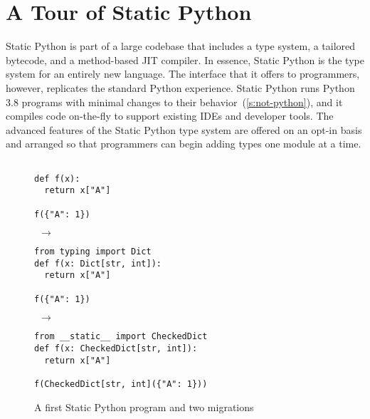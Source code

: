 \documentclass[english,cleveref,submission]{programming}
\newcommand{\SP}{Static Python}
\begin{document}
\section{A Tour of \SP{}}
\label{s:tour}


\SP{} is part of a large codebase that includes a type system, a tailored
bytecode, and a method-based JIT compiler.
In essence, \SP{} is the type system for an entirely new language.
The interface that it offers to programmers, however, replicates the
standard Python experience.
\SP{} runs Python 3.8 programs with minimal changes to their
behavior~(\cref{s:not-python}),
and it compiles code on-the-fly to support existing
IDEs and developer tools.
The advanced features of the \SP{} type system are offered on an opt-in basis
and arranged so that programmers can begin adding types one module at a time.

\begin{figure}
  \begin{minipage}{0.15\columnwidth}\noindent\begin{lstlisting}

def f(x):
  return x["A"]

f({"A": 1})
  \end{lstlisting}
\end{minipage}\begin{minipage}{0.07\columnwidth}\(~~\rightarrow\!\!\!\!\)\end{minipage}\begin{minipage}{0.32\columnwidth}\noindent\begin{lstlisting}
from typing import Dict
def f(x: Dict[str, int]):
  return x["A"]

f({"A": 1})
  \end{lstlisting}
  \end{minipage}\begin{minipage}{0.07\columnwidth}\(~~\rightarrow\!\!\!\!\)\end{minipage}\begin{minipage}{0.38\columnwidth}\noindent\begin{lstlisting}
from __static__ import CheckedDict
def f(x: CheckedDict[str, int]):
  return x["A"]

f(CheckedDict[str, int]({"A": 1}))
  \end{lstlisting}
  \end{minipage}


  \caption{A first \SP{} program and two migrations}
  \label{fig:sp-example}
\end{figure}
\end{document}
